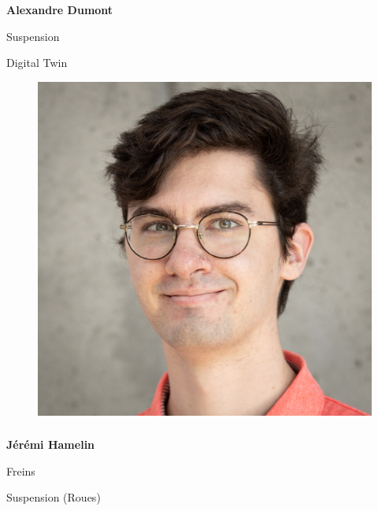 \documentclass[a0paper,portrait]{baposter}
\begin{document}
\begin{poster}
{\subsubsection*{}
\vspace{2mm}
\textbf{Alexandre Dumont}

Suspension

Digital Twin

\begin{figure}
\includegraphics[width=.9\linewidth]{img/membres/Jérémi-Hamelin-3.jpg} 
\end{figure}
\subsubsection*{}
\vspace{2mm}
\textbf{Jérémi Hamelin}

Freins

Suspension (Roues)

\vspace{1cm}
}



\end{poster}
\end{document}

